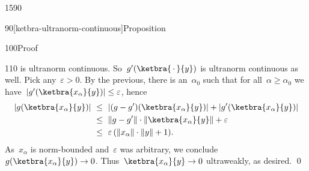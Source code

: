 \begin{parsec}{1590}
\begin{point}{90}[ketbra-ultranorm-continuous]{Proposition}
\begin{point}{100}{Proof}
\begin{point}{110}
    is ultranorm continuous.
    So~$g'(\ketbra{\,\cdot\,}{y})$ is ultranorm continuous as well.
Pick any~$\varepsilon > 0$.
By the previous,
    there is an~$\alpha_0$ such that for all~$\alpha \geq \alpha_0$
    we have~$|g'(\ketbra{x_\alpha}{y})| \leq \varepsilon$,
    hence
\begin{align*}
        | g(\ketbra{x_\alpha}{y}) |
            &\ \leq\  | (g-g')(\ketbra{x_\alpha}{y})|  +
                    | g'(\ketbra{x_\alpha}{y}) | \\
            &\ \leq\  \|g - g'\| \cdot \| \ketbra{x_\alpha}{y} \|  + \varepsilon\\
            &\ \leq\  \varepsilon \,(\| x_\alpha\| \cdot \|y\| + 1).
\end{align*}
As~$x_\alpha$ is norm-bounded
    and~$\varepsilon$ was arbitrary,
        we conclude~$g(\ketbra{x_\alpha}{y}) \to 0$.
    Thus~$\ketbra{x_\alpha}{y} \to 0$ ultraweakly, as desired.
    \qed
\end{point}
\end{point}
\end{point}
\end{parsec}

